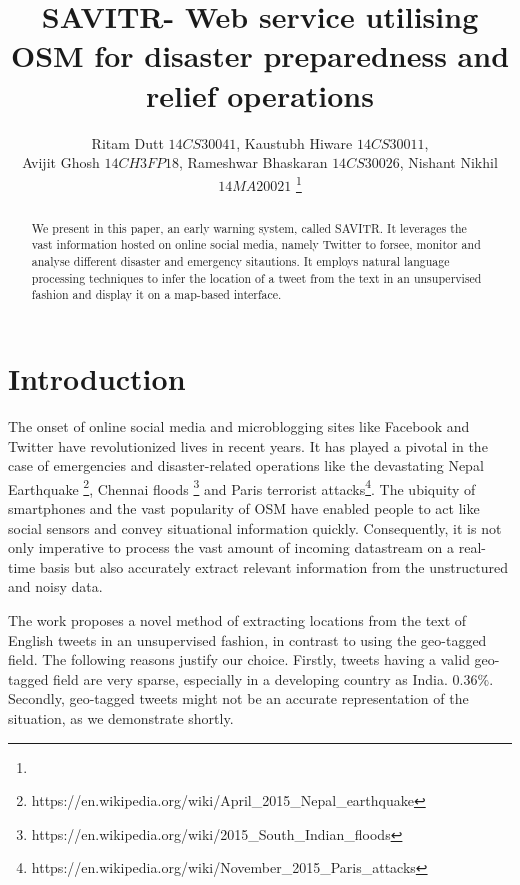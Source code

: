 \documentclass[journal, a4paper]{IEEEtran}
\begin{document}
	\title{SAVITR- Web service utilising OSM for disaster preparedness and relief operations}
	\author{Ritam Dutt \(14CS30041\), Kaustubh Hiware \(14CS30011\),\\ Avijit Ghosh \(14CH3FP18\), Rameshwar Bhaskaran \(14CS30026\), Nishant Nikhil \(14MA20021\)
	\thanks{}}
	\markboth{}{}
	\maketitle

\begin{abstract}
	We present in this paper, an early warning system, called SAVITR. It leverages the vast information hosted on online social media, namely Twitter to forsee, monitor and analyse different disaster and emergency sitautions. It employs natural language processing techniques to infer the location of a tweet from the text in an unsupervised fashion and display it on a map-based interface. 
\end{abstract}

\section{Introduction}
	The onset of online social media and microblogging sites like Facebook and Twitter have revolutionized lives in recent years. It has played a pivotal in the case of emergencies and disaster-related operations like the devastating Nepal Earthquake \footnote{https://en.wikipedia.org/wiki/April\_2015\_Nepal\_earthquake}, Chennai floods \footnote{https://en.wikipedia.org/wiki/2015\_South\_Indian\_floods} and Paris terrorist attacks\footnote{https://en.wikipedia.org/wiki/November\_2015\_Paris\_attacks}.
	The ubiquity of smartphones and the vast popularity of OSM have enabled people to act like social sensors and convey situational information quickly. Consequently, it is not only imperative to process the vast amount of incoming datastream on a real-time basis but also accurately extract relevant information from the unstructured and noisy data.
	
	The work proposes a novel method of extracting locations from the text of English tweets in an unsupervised fashion, in contrast to using the geo-tagged field. The following reasons justify our choice. Firstly, tweets having a valid geo-tagged field are very sparse, especially in a developing country as India. \(0.36\%\). Secondly, geo-tagged tweets might not be an accurate representation of the situation, as we demonstrate shortly. 
	
\end{document}
